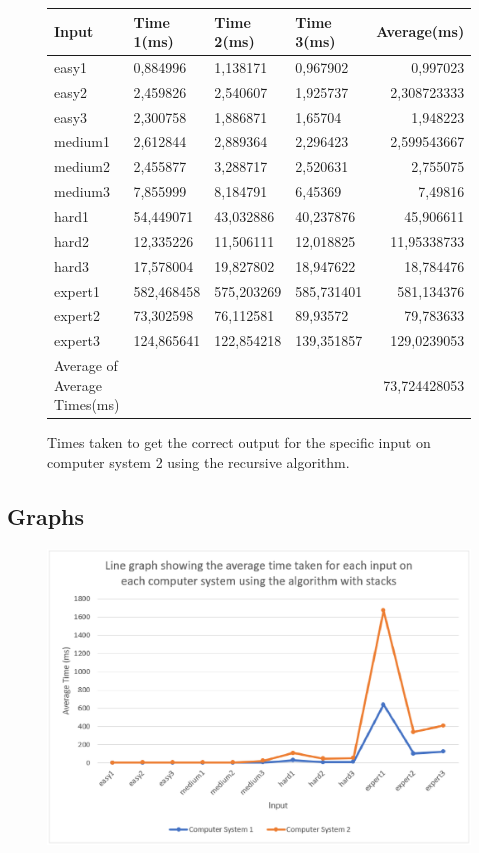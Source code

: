 \documentclass[11pt]{article}
\begin{document}
\begin{figure}[H]
\centering
\begin{tabular}{|l|l|l|l|r|}
\hline
Input & Time 1(ms) & Time 2(ms) & Time 3(ms) & Average(ms)\\
\hline
easy1&	0,884996&	1,138171&	0,967902&	0,997023\\
easy2&	2,459826&	2,540607&	1,925737&	2,308723333\\
easy3&	2,300758&	1,886871&	1,65704&	1,948223\\
medium1& 2,612844&	2,889364&	2,296423&	2,599543667\\
medium2& 2,455877&	3,288717&	2,520631&	2,755075\\
medium3& 7,855999&	8,184791&	6,45369&	7,49816\\
hard1& 54,449071&	43,032886&	40,237876&	45,906611\\
hard2&	12,335226&	11,506111&	12,018825&	11,95338733\\
hard3&	17,578004&	19,827802&	18,947622&	18,784476\\
expert1&582,468458&	575,203269&	585,731401&	581,134376\\
expert2&73,302598&	76,112581&	89,93572&	79,783633\\
expert3&124,865641&	122,854218&	139,351857&	129,0239053\\

\hline
Average of Average Times(ms) & & & &73,724428053\\
\hline
\end{tabular}
\caption{Times taken to get the correct output for the specific input on computer system 2 using the recursive algorithm.}
\end{figure}


\subsection{Graphs}

\begin{figure}[H]
\centering
\includegraphics[scale=0.54]{fig5.eps}
\caption{ }
\end{figure}
\end{document}
